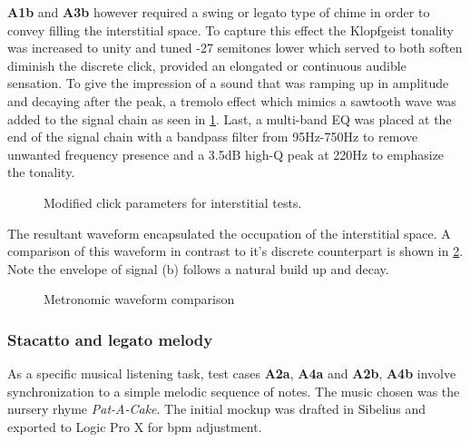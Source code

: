 \textbf{A1b} and \textbf{A3b} however required a swing or legato type of chime in order to convey filling the interstitial space. To capture this effect the Klopfgeist tonality was increased to unity and tuned -27 semitones lower which served to both soften diminish the discrete click, provided an elongated or continuous audible sensation. To give the impression of a sound that was ramping up in amplitude and decaying after the peak, a tremolo effect which mimics a sawtooth wave was added to the signal chain as seen in \ref{fig:modClick}. Last, a multi-band EQ was placed at the end of the signal chain with a bandpass filter from 95Hz-750Hz to remove unwanted frequency presence and a 3.5dB high-Q peak at 220Hz to emphasize the tonality.

\begin{figure}[H]
    \centering
    \caption{Modified click parameters for interstitial tests.}
        \qquad
        \qquad
    \label{fig:modClick}
\end{figure}

The resultant waveform encapsulated the occupation of the interstitial space. A comparison of this waveform in contrast to it's discrete counterpart is shown in \ref{fig:click_comparison}. Note the envelope of signal (b) follows a natural build up and decay.

\begin{figure}[H]
    \centering
    \caption{Metronomic waveform comparison}
    \label{fig:click_comparison}
\end{figure}

\subsubsection{Stacatto and legato melody}
As a specific musical listening task, test cases \textbf{A2a}, \textbf{A4a} and \textbf{A2b}, \textbf{A4b} involve synchronization to a simple melodic sequence of notes. The music chosen was the nursery rhyme \textit{Pat-A-Cake}. The initial mockup was drafted in Sibelius and exported to Logic Pro X for bpm adjustment.


